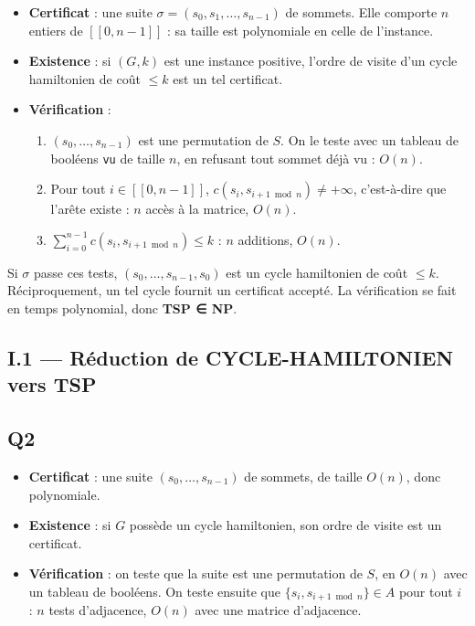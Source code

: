 \documentclass[11pt,a4paper]{article}
\providecommand{\tightlist}{\setlength{\itemsep}{0pt}\setlength{\parskip}{0pt}}
\begin{document}
\begin{itemize}
\tightlist
\item
  \textbf{Certificat} : une suite \(\sigma=(s_0,s_1,\dots,s_{n-1})\) de sommets. Elle comporte \(n\) entiers de \([\![0,n-1]\!]\) : sa taille est polynomiale en celle de l'instance.
\item
  \textbf{Existence} : si \((G,k)\) est une instance positive, l'ordre de visite d'un cycle hamiltonien de coût \(\le k\) est un tel certificat.
\item
  \textbf{Vérification} :

  \begin{enumerate}
  \def\labelenumi{\arabic{enumi}.}
  \tightlist
  \item
    \((s_0,\dots,s_{n-1})\) est une permutation de \(S\). On le teste avec un tableau de booléens \texttt{vu} de taille \(n\), en refusant tout sommet déjà vu : \(O(n)\).
  \item
    Pour tout \(i\in[\![0,n-1]\!]\), \(c(s_i,s_{i+1 \bmod n})\neq+\infty\), c'est-à-dire que l'arête existe : \(n\) accès à la matrice, \(O(n)\).
  \item
    \(\sum_{i=0}^{n-1}c(s_i,s_{i+1\bmod n})\le k\) : \(n\) additions, \(O(n)\).
  \end{enumerate}
\end{itemize}

Si \(\sigma\) passe ces tests, \((s_0,\dots,s_{n-1},s_0)\) est un cycle hamiltonien de coût \(\le k\). Réciproquement, un tel cycle fournit un certificat accepté. La vérification se fait en temps polynomial, donc \textbf{TSP ∈ NP}.

\hypertarget{i.1-ruxe9duction-de-cycle-hamiltonien-vers-tsp}{%
\subsection{I.1 --- Réduction de CYCLE-HAMILTONIEN vers TSP}\label{i.1-ruxe9duction-de-cycle-hamiltonien-vers-tsp}}

\hypertarget{q2}{%
\subsection{Q2}\label{q2}}

\begin{itemize}
\tightlist
\item
  \textbf{Certificat} : une suite \((s_0,\dots,s_{n-1})\) de sommets, de taille \(O(n)\), donc polynomiale.
\item
  \textbf{Existence} : si \(G\) possède un cycle hamiltonien, son ordre de visite est un certificat.
\item
  \textbf{Vérification} : on teste que la suite est une permutation de \(S\), en \(O(n)\) avec un tableau de booléens. On teste ensuite que \(\{s_i,s_{i+1\bmod n}\}\in A\) pour tout \(i\) : \(n\) tests d'adjacence, \(O(n)\) avec une matrice d'adjacence.
\end{itemize}
\end{document}
